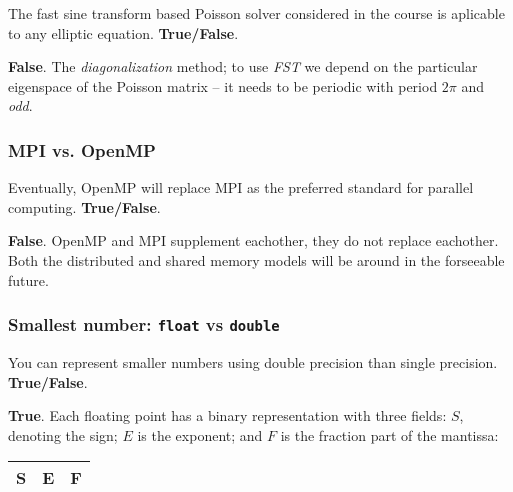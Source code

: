 \begin{question}
  The fast sine transform based Poisson solver considered in the course is aplicable to any elliptic equation. \textbf{True/False}.
\end{question}

\textbf{False}. The \emph{diagonalization} method; to use \emph{FST} we depend on the particular eigenspace of the Poisson matrix -- it needs to be periodic with period $2\pi$ and \emph{odd}.

\subsubsection{MPI vs. OpenMP} %
\label{ssub:mpi_vs_openmp}


\begin{question}
  Eventually, OpenMP will replace MPI as the preferred standard for parallel computing. \textbf{True/False}.
\end{question}

\textbf{False}. OpenMP and MPI supplement eachother, they do not replace eachother. Both the distributed and shared memory models will be around in the forseeable future.

\subsubsection{Smallest number: \texttt{float} vs \texttt{double}} %
\label{ssub:smallest_number_tt}

\begin{question}
  You can represent smaller numbers using double precision than single precision. \textbf{True/False}.
\end{question}

\textbf{True}. Each floating point has a binary representation with three fields: $S$, denoting the sign; $E$ is the exponent; and $F$ is the fraction part of the mantissa:

\vspace{1em}

\begin{center}
  \begin{tabular}{|c|c|c|}
    \hline
    S & \hspace{4em} E \hspace{4em} & \hspace{8em} F \hspace{8em} \\
    \hline
  \end{tabular}
\end{center}


